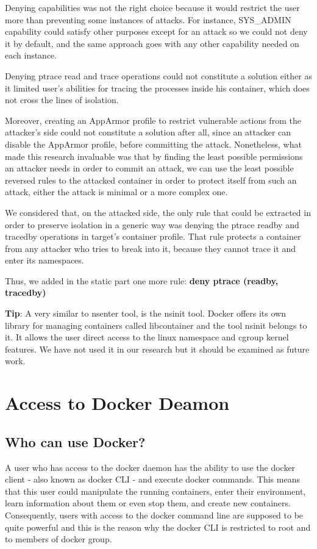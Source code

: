Denying capabilities was not the right choice because it would restrict the user more than preventing some instances of attacks. For instance, SYS\_ADMIN capability could satisfy other purposes except for an attack so we could not deny it by default, and the same approach goes with any other capability needed on each instance.

Denying ptrace read and trace operations could not constitute a solution either as it limited user's abilities for tracing the processes inside his container, which does not cross the lines of isolation.

Moreover, creating an AppArmor profile to restrict vulnerable actions from the attacker's side could not constitute a solution after all, since an attacker can disable the AppArmor profile, before committing the attack. Nonetheless, what made this research invaluable was that by finding the least possible permissions an attacker needs in order to commit an attack, we can use the least possible reversed rules to the attacked container in order to protect itself from such an attack, either the attack is minimal or a more complex one.

We considered that, on the attacked side, the only rule that could be extracted in order to preserve isolation in a generic way was denying the ptrace readby and tracedby operations in target's container profile. That rule protects a container from any attacker who tries to break into it, because they cannot trace it and enter its namespaces.
 
Thus, we added in the static part one more rule: \textbf{deny ptrace (readby, tracedby)}

\begin{mdframed}[backgroundcolor=tipcolor]
\textbf{Tip}: A very similar to nsenter tool, is the nsinit tool. Docker offers its own library for managing containers called libcontainer and the tool nsinit belongs to it. It allows the user direct access to the linux namespace and cgroup kernel features. We have not used it in our research but it should be examined as future work.
\end{mdframed}

\section{Access to Docker Deamon} \label{accesstodockerdaemon}
\subsection{Who can use Docker?}
A user who has access to the docker daemon has the ability to use the docker client - also known as docker CLI - and execute docker commands. This means that this user could manipulate the running containers, enter their environment, learn information about them or even stop them, and create new containers. Consequently, users with access to the docker command line are supposed to be quite powerful and this is the reason why the docker CLI is restricted to root and to members of docker group.

